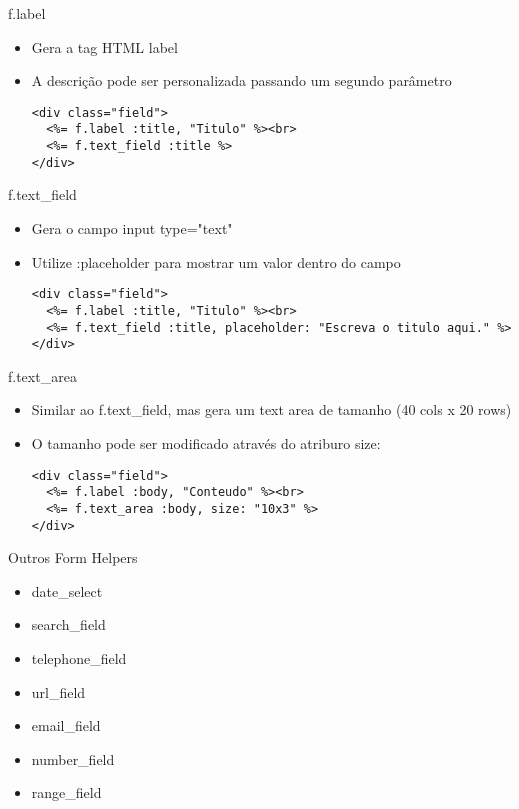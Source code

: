 \begin{frame}[t, fragile]{f.label}
	\begin{itemize}
		\item Gera a tag HTML \alert{label} 
		\item A descrição pode ser \alert{personalizada} passando um segundo parâmetro
		\begin{lstlisting}[style=RubyInputStyle]
<div class="field">
  <%= f.label :title, "Titulo" %><br>
  <%= f.text_field :title %>
</div>
		\end{lstlisting}	
	\end{itemize}	
\end{frame}
\begin{frame}[t, fragile]{f.text\_field}
	\begin{itemize}
		\item Gera o campo \alert{input type="text"} 
		\item Utilize \alert{:placeholder} para mostrar um valor dentro do campo
		\begin{lstlisting}[style=RubyInputStyle]
<div class="field">
  <%= f.label :title, "Titulo" %><br>
  <%= f.text_field :title, placeholder: "Escreva o titulo aqui." %>
</div>		
		\end{lstlisting}	
	\end{itemize}	
\end{frame}
\begin{frame}[t, fragile]{f.text\_area}
	\begin{itemize}
		\item Similar ao \alert{f.text\_field}, mas gera um text area de tamanho (40 cols x 20 rows) 
		\item O tamanho pode ser modificado através do atriburo size:
		\begin{lstlisting}[style=RubyInputStyle]
<div class="field">
  <%= f.label :body, "Conteudo" %><br>
  <%= f.text_area :body, size: "10x3" %>
</div>			
		\end{lstlisting}	
	\end{itemize}	
\end{frame}
\begin{frame}[t, fragile]{Outros Form Helpers}
	\begin{itemize}
		\item date\_select 
		\item search\_field
		\item telephone\_field
		\item url\_field
		\item email\_field
		\item number\_field
		\item range\_field	
	\end{itemize}	
\end{frame}
